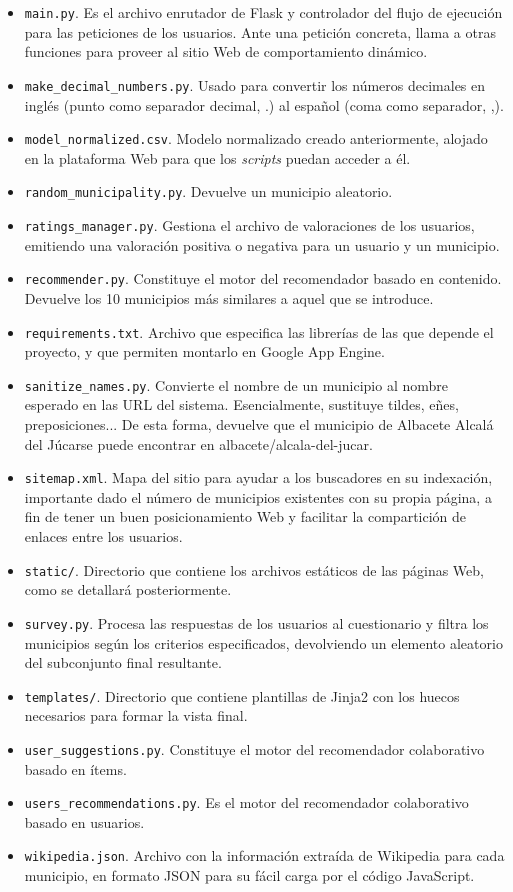 \begin{itemize}
	\item \texttt{main.py}. Es el archivo enrutador de Flask y controlador del flujo de ejecución para las peticiones de los usuarios. Ante una petición concreta, llama a otras funciones para proveer al sitio Web de comportamiento dinámico.
	\item \texttt{make\_decimal\_numbers.py}. Usado para convertir los números decimales en inglés (punto como separador decimal, \guillemotleft .\guillemotright\space) al español (coma como separador, \guillemotleft ,\guillemotright\space).
	\item \texttt{model\_normalized.csv}. Modelo normalizado creado anteriormente, alojado en la plataforma Web para que los \textit{scripts} puedan acceder a él.
	\item \texttt{random\_municipality.py}. Devuelve un municipio aleatorio.
	\item \texttt{ratings\_manager.py}. Gestiona el archivo de valoraciones de los usuarios, emitiendo una valoración positiva o negativa para un usuario y un municipio.
	\item \texttt{recommender.py}. Constituye el motor del recomendador basado en contenido. Devuelve los 10 municipios más similares a aquel que se introduce.
	\item \texttt{requirements.txt}. Archivo que especifica las librerías de las que depende el proyecto, y que permiten montarlo en Google App Engine.
	\item \texttt{sanitize\_names.py}. Convierte el nombre de un municipio al nombre esperado en las URL del sistema. Esencialmente, sustituye tildes, eñes, preposiciones... De esta forma, devuelve que el municipio de Albacete \guillemotleft Alcalá del Júcar\guillemotright\space se puede encontrar en \guillemotleft albacete/alcala-del-jucar\guillemotright.
	\item \texttt{sitemap.xml}. Mapa del sitio para ayudar a los buscadores en su indexación, importante dado el número de municipios existentes con su propia página, a fin de tener un buen posicionamiento Web y facilitar la compartición de enlaces entre los usuarios.
	\item \texttt{static/}. Directorio que contiene los archivos estáticos de las páginas Web, como se detallará posteriormente.
	\item \texttt{survey.py}. Procesa las respuestas de los usuarios al cuestionario y filtra los municipios según los criterios especificados, devolviendo un elemento aleatorio del subconjunto final resultante.
	\item \texttt{templates/}. Directorio que contiene plantillas de Jinja2 con los huecos necesarios para formar la vista final.
	\item \texttt{user\_suggestions.py}. Constituye el motor del recomendador colaborativo basado en ítems.
	\item \texttt{users\_recommendations.py}. Es el motor del recomendador colaborativo basado en usuarios.
	\item \texttt{wikipedia.json}. Archivo con la información extraída de Wikipedia para cada municipio, en formato JSON para su fácil carga por el código JavaScript.

\end{itemize}

